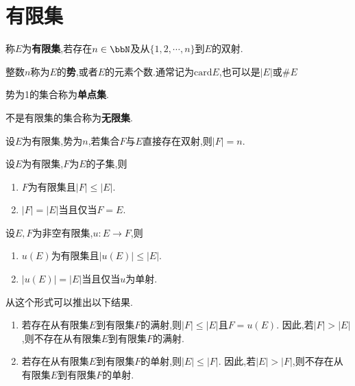 \section{有限集}

\begin{deff}
    称$E$为\textbf{有限集},若存在$n \in \bbN$及从$\{ 1, 2, \cdots, n \}$到$E$的双射.

    整数$n$称为$E$的\textbf{势},或者$E$的元素个数.通常记为$\mathrm{card} E$,也可以是$\lvert E \rvert$或$\# E$
\end{deff}

\begin{rqq}
    势为1的集合称为\textbf{单点集}.
\end{rqq}

\begin{rqq}
    不是有限集的集合称为\textbf{无限集}.
\end{rqq}

\begin{prop}
    设$E$为有限集,势为$n$,若集合$F$与$E$直接存在双射,则$\lvert F \rvert = n$.
\end{prop}

\begin{prop}
    设$E$为有限集,$F$为$E$的子集,则
    \begin{enumerate}
        \item $F$为有限集且$\lvert F \rvert \leqslant \lvert E \rvert$.
        \item $\lvert F \rvert = \lvert E \rvert$当且仅当$F = E$.
    \end{enumerate}
\end{prop}

\begin{prop}
    设$E, F$为非空有限集,$u: E \to F$,则
    \begin{enumerate}
        \item $u(E)$为有限集且$\lvert u(E) \rvert \leqslant \lvert E \rvert$.
        \item $\lvert u(E) \rvert = \lvert E \rvert$当且仅当$u$为单射.
    \end{enumerate}
\end{prop}

\begin{rqq}
    从这个形式可以推出以下结果.
    \begin{enumerate}
        \item 若存在从有限集$E$到有限集$F$的满射,则$\lvert F \rvert \leqslant \lvert E \rvert$且$F = u(E)$.
        因此,若$\lvert F \rvert > \lvert E \rvert$,则不存在从有限集$E$到有限集$F$的满射.
        \item 若存在从有限集$E$到有限集$F$的单射,则$\lvert E \rvert \leqslant \lvert F \rvert$.
        因此,若$\lvert E \rvert > \lvert F \rvert$,则不存在从有限集$E$到有限集$F$的单射.
    \end{enumerate}
\end{rqq}

